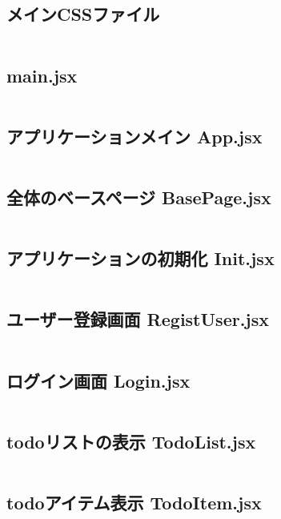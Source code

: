 \documentclass[paper=a4paper, fontsize=10pt, head_space=10mm, foot_space=17mm, gutter=17mm, line_length=185mm, twoside]{jlreq}
\begin{document}
\subsection {メインCSSファイル}
\inputminted[linenos, breaklines]{css}{src-react/App.css}
\clearpage

\subsection {main.jsx}
\inputminted[linenos, breaklines]{jsx}{src-react/main.jsx}
\clearpage

\subsection {アプリケーションメイン App.jsx}
\inputminted[linenos, breaklines]{jsx}{src-react/App.jsx}
\clearpage

\subsection {全体のベースページ BasePage.jsx}
\inputminted[linenos, breaklines]{jsx}{src-react/BasePage.jsx}
\clearpage

\subsection {アプリケーションの初期化 Init.jsx}
\inputminted[linenos, breaklines]{jsx}{src-react/Init.jsx}
\clearpage

\subsection {ユーザー登録画面 RegistUser.jsx}
\inputminted[linenos, breaklines]{jsx}{src-react/RegistUser.jsx}
\clearpage

\subsection {ログイン画面 Login.jsx}
\inputminted[linenos, breaklines]{jsx}{src-react/Login.jsx}
\clearpage

\subsection {todoリストの表示 TodoList.jsx}
\inputminted[linenos, breaklines]{jsx}{src-react/TodoList.jsx}
\clearpage

\subsection {todoアイテム表示 TodoItem.jsx}
\inputminted[linenos, breaklines]{jsx}{src-react/TodoItem.jsx}
\clearpage
\end{document}
